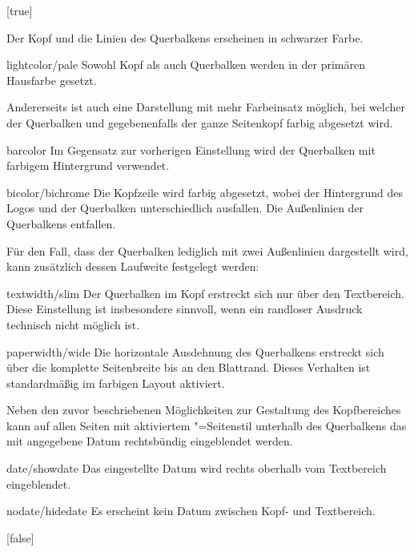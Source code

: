 \begin{Declaration*}{}
\begin{Declaration*}{}
\begin{Declaration*}{}
\begin{Declaration}[%
  v2.03;%
  v2.04!\Option{cdhead=barcolor}:nur farbig abgesetzter Querbalken;%
  v2.05!\Option{cdhead=date}:Datum zwischen Kopf- und Textbereich;%
]{}[true]
\begin{values}{}
  Der Kopf und die Linien des Querbalkens erscheinen in schwarzer Farbe.
\item[lightcolor/pale]
  Sowohl Kopf als auch Querbalken werden in der primären Hausfarbe gesetzt.
\end{values}
%
Andererseits ist auch eine Darstellung mit mehr Farbeinsatz möglich, bei 
welcher der Querbalken und gegebenenfalls der ganze Seitenkopf farbig 
abgesetzt wird.
%
\begin{values}{}
\item[barcolor]
  Im Gegensatz zur vorherigen Einstellung wird der Querbalken mit farbigem 
  Hintergrund verwendet.
\item[bicolor/bichrome]
  Die Kopfzeile wird farbig abgesetzt, wobei der Hintergrund des Logos und der 
  Querbalken unterschiedlich ausfallen. Die Außenlinien der Querbalkens 
  entfallen.
\end{values}
%
Für den Fall, dass der Querbalken lediglich mit zwei Außenlinien dargestellt 
wird, kann zusätzlich dessen Laufweite festgelegt werden:
%
\begin{values}{}
\item[textwidth/slim]
  Der Querbalken im Kopf erstreckt sich nur über den Textbereich. Diese 
  Einstellung ist insbesondere sinnvoll, wenn ein randloser Ausdruck technisch 
  nicht möglich ist. 
\item[paperwidth/wide]
  Die horizontale Ausdehnung des Querbalkens erstreckt sich über die komplette 
  Seitenbreite bis an den Blattrand. Dieses Verhalten ist standardmäßig im 
  farbigen Layout aktiviert.
\end{values}
%
Neben den zuvor beschriebenen Möglichkeiten zur Gestaltung des Kopfbereiches 
kann auf allen Seiten mit aktiviertem "=Seitenstil 
unterhalb des Querbalkens das mit  angegebene Datum rechtsbündig 
eingeblendet werden.
%
\begin{values}{}
\item[date/showdate]
  Das eingestellte Datum wird rechts oberhalb vom Textbereich eingeblendet.
\item[nodate/hidedate]
  Es erscheint kein Datum zwischen Kopf- und Textbereich.
\end{values}
\end{Declaration}

\begin{Declaration}[%
  v2.03!\Option{cdfoot=color}:farbiger Hintergrund der Fußzeile;%
  v2.03!\Option{cdfoot=\PValueName{Höhe}};%
]{}[false]%
\printdeclarationlist%
%
%
%


\end{Declaration}
\end{Declaration*}
\end{Declaration*}
\end{Declaration*}
